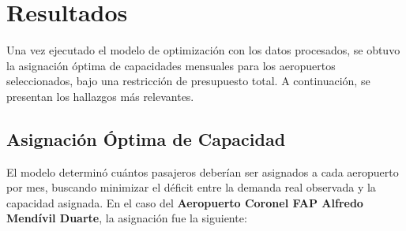 \documentclass[11pt, a4paper, twocolumn]{article}
\begin{document}
\section{Resultados}

Una vez ejecutado el modelo de optimización con los datos procesados, se obtuvo la asignación óptima de capacidades mensuales para los aeropuertos seleccionados, bajo una restricción de presupuesto total. A continuación, se presentan los hallazgos más relevantes.

\subsection{Asignación Óptima de Capacidad}

El modelo determinó cuántos pasajeros deberían ser asignados a cada aeropuerto por mes, buscando minimizar el déficit entre la demanda real observada y la capacidad asignada. En el caso del \textbf{Aeropuerto Coronel FAP Alfredo Mendívil Duarte}, la asignación fue la siguiente:

\begin{table}[H]
\centering
\caption{Asignación óptima de capacidad por mes en el Aeropuerto Coronel FAP Alfredo Mendívil Duarte.}
\label{tab:capacidad_optima}
\end{table}
\end{document}
